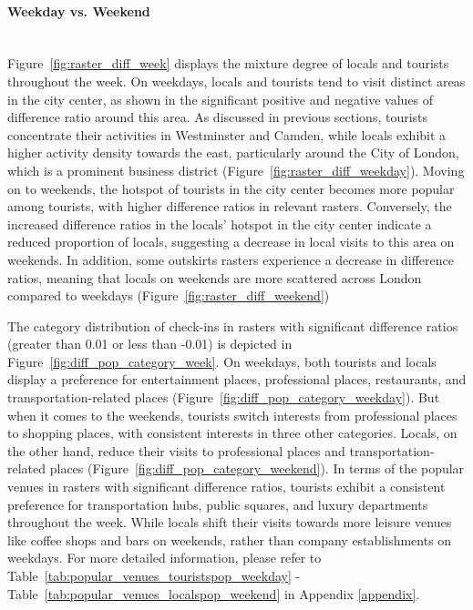 \documentclass{article}
\newcommand{\subsubsubsection}[1]{\paragraph{#1}\mbox{}\\}
\theoremstyle{definition}
\theoremstyle{remark}
\begin{document}
\subsubsubsection{Weekday vs. Weekend}
Figure~\ref{fig:raster_diff_week} displays the mixture degree of locals and tourists throughout the week. On weekdays, locals and tourists tend to visit distinct areas in the city center, as shown in the significant positive and negative values of difference ratio around this area. As discussed in previous sections, tourists concentrate their activities in Westminster and Camden, while locals exhibit a higher activity density towards the east, particularly around the City of London, which is a prominent business district (Figure~\ref{fig:raster_diff_weekday}). Moving on to weekends, the hotspot of tourists in the city center becomes more popular among tourists, with higher difference ratios in relevant rasters. Conversely, the increased difference ratios in the locals' hotspot in the city center indicate a reduced proportion of locals, suggesting a decrease in local visits to this area on weekends. In addition, some outskirts rasters experience a decrease in difference ratios, meaning that locals on weekends are more scattered across London compared to weekdays (Figure~\ref{fig:raster_diff_weekend})

The category distribution of check-ins in rasters with significant difference ratios (greater than 0.01 or less than -0.01) is depicted in Figure~\ref{fig:diff_pop_category_week}. On weekdays, both tourists and locals display a preference for entertainment places, professional places, restaurants, and transportation-related places (Figure~\ref{fig:diff_pop_category_weekday}). But when it comes to the weekends, tourists switch interests from professional places to shopping places, with consistent interests in three other categories. Locals, on the other hand, reduce their visits to professional places and transportation-related places (Figure~\ref{fig:diff_pop_category_weekend}). In terms of the popular venues in rasters with significant difference ratios, tourists exhibit a consistent preference for transportation hubs, public squares, and luxury departments throughout the week. While locals shift their visits towards more leisure venues like coffee shops and bars on weekends, rather than company establishments on weekdays. For more detailed information, please refer to Table~\ref{tab:popular_venues_touristspop_weekday} - Table~\ref{tab:popular_venues_localspop_weekend} in Appendix \ref{appendix}.
\end{document}
